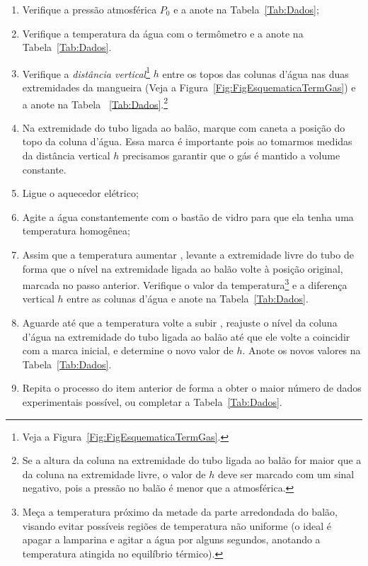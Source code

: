 \begin{enumerate}
\item Verifique a pressão atmosférica $P_0$ e a anote na Tabela~\ref{Tab:Dados};
\item Verifique a temperatura da água com o termômetro e a anote na Tabela~\ref{Tab:Dados}.
\item Verifique a \emph{distância vertical}\footnote{Veja a Figura~\ref{Fig:FigEsquematicaTermGas}.} $h$ entre os topos das colunas d'água nas duas extremidades da mangueira (Veja a Figura~\ref{Fig:FigEsquematicaTermGas}) e a anote na Tabela~
\ref{Tab:Dados}.\footnote{Se a altura da coluna na extremidade do tubo ligada ao balão for maior que a da coluna na extremidade livre, o valor de $h$ deve ser marcado com um sinal negativo, pois a pressão no balão é menor que a atmosférica.}
\item Na extremidade do tubo ligada ao balão, marque com caneta a posição do topo da coluna d'água. Essa marca é importante pois ao tomarmos medidas da distância vertical $h$ precisamos garantir que o gás é mantido a volume constante.
\item Ligue o aquecedor elétrico;
\item Agite a água constantemente com o bastão de vidro para que ela tenha uma temperatura homogênea; 
\item Assim que a temperatura aumentar , levante a extremidade livre do tubo de forma que o nível na extremidade ligada ao balão volte à posição original, marcada no passo anterior. Verifique o valor da temperatura\footnote{Meça a temperatura próximo da metade da parte arredondada do balão, visando evitar possíveis regiões de temperatura não uniforme (o ideal é apagar a lamparina e agitar a água por alguns segundos, anotando a temperatura atingida no equilíbrio térmico).} e a diferença vertical $h$ entre as colunas d'água e anote na Tabela~\ref{Tab:Dados}.
\item Aguarde até que a temperatura volte a subir , reajuste o nível da coluna d'água na extremidade do tubo ligada ao balão até que ele volte a coincidir com a marca inicial, e determine o novo valor de $h$. Anote os novos valores na Tabela~\ref{Tab:Dados}.
\item Repita o processo do item anterior de forma a obter o maior número de dados experimentais possível, ou completar a Tabela~\ref{Tab:Dados}.
\end{enumerate}

\cleardoublepage

